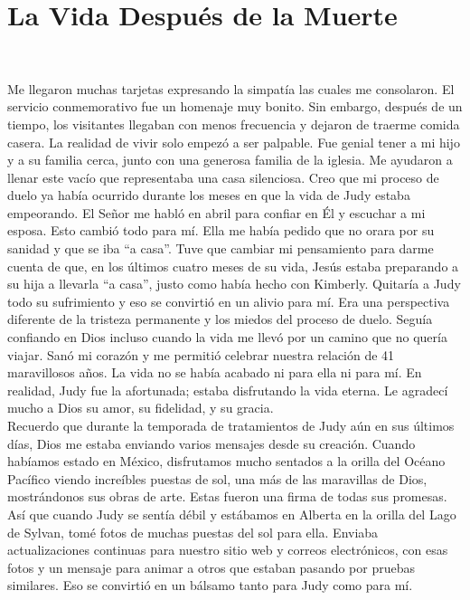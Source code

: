 \documentclass[twoside, 12pt]{book}
\begin{document}
\chapter{La Vida Después de la Muerte }
\

Me llegaron muchas tarjetas expresando la simpatía las cuales me consolaron. El servicio conmemorativo fue un homenaje muy bonito. Sin embargo, después de un tiempo, los visitantes llegaban con menos frecuencia y dejaron de traerme comida casera.   La realidad de vivir solo empezó a ser palpable.  Fue genial tener a mi hijo y a su familia cerca, junto con una generosa familia de la iglesia.  Me ayudaron a llenar este vacío que representaba una casa silenciosa. Creo que mi proceso de duelo ya había ocurrido durante los meses en que la vida de Judy estaba empeorando. El Señor me habló en abril para confiar en Él y escuchar a mi esposa. Esto cambió todo para mí. Ella me había pedido que no orara por su sanidad y que se iba “a casa”. Tuve que cambiar mi pensamiento para darme cuenta de que, en los últimos cuatro meses de su vida, Jesús estaba preparando a su hija a llevarla “a casa”, justo como había hecho con Kimberly. Quitaría a Judy todo su sufrimiento y eso se convirtió en un alivio para mí. Era una perspectiva diferente de la tristeza permanente y los miedos del proceso de duelo. Seguía confiando en Dios incluso cuando la vida me llevó por un camino que no quería viajar. Sanó mi corazón y me permitió celebrar nuestra relación de 41 maravillosos años.  La vida no se había acabado ni para ella ni para mí.  En realidad, Judy fue la afortunada; estaba disfrutando la vida eterna. Le agradecí mucho a Dios su amor, su fidelidad, y su gracia.\\

Recuerdo que durante la temporada de tratamientos de Judy aún en sus últimos días, Dios me estaba enviando varios mensajes desde su creación.  Cuando habíamos estado en México, disfrutamos mucho sentados a la orilla del Océano Pacífico viendo increíbles puestas de sol, una más de las maravillas de Dios, mostrándonos sus obras de arte. Estas fueron una firma de todas sus promesas. Así que cuando Judy se sentía débil y estábamos en Alberta en la orilla del Lago de Sylvan, tomé fotos de muchas puestas del sol para ella. Enviaba actualizaciones continuas para nuestro sitio web y correos electrónicos, con esas fotos y un mensaje para animar a otros que estaban pasando por pruebas similares. Eso se convirtió en un bálsamo tanto para Judy como para mí.\\
\end{document}
